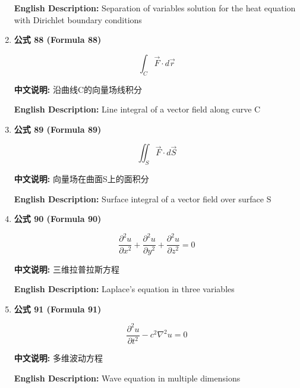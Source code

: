 \documentclass[12pt,a4paper]{article}
\begin{document}
\begin{enumerate}[leftmargin=*]
\textbf{English Description:} Separation of variables solution for the heat equation with Dirichlet boundary conditions

\vspace{0.5cm}

\item \textbf{公式 88 (Formula 88)}

\begin{equation}
\int_{C} \vec{F} \cdot d\vec{r}
\end{equation}

\textbf{中文说明:} 沿曲线C的向量场线积分

\textbf{English Description:} Line integral of a vector field along curve C

\vspace{0.5cm}

\item \textbf{公式 89 (Formula 89)}

\begin{equation}
\iint_{S} \vec{F} \cdot d\vec{S}
\end{equation}

\textbf{中文说明:} 向量场在曲面S上的面积分

\textbf{English Description:} Surface integral of a vector field over surface S

\vspace{0.5cm}

\item \textbf{公式 90 (Formula 90)}

\begin{equation}
\frac{\partial^2 u}{\partial x^2} + \frac{\partial^2 u}{\partial y^2} + \frac{\partial^2 u}{\partial z^2} = 0
\end{equation}

\textbf{中文说明:} 三维拉普拉斯方程

\textbf{English Description:} Laplace's equation in three variables

\vspace{0.5cm}

\item \textbf{公式 91 (Formula 91)}

\begin{equation}
\frac{\partial^2 u}{\partial t^2} - c^2 \nabla^2 u = 0
\end{equation}

\textbf{中文说明:} 多维波动方程

\textbf{English Description:} Wave equation in multiple dimensions


\end{enumerate}
\end{document}

